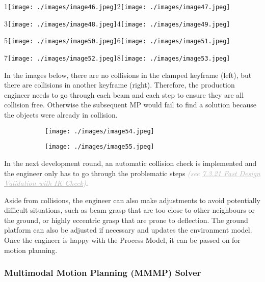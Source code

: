 {\footnotesize 1\texttt{[image: ./images/image46.jpeg]}2\texttt{[image: ./images/image47.jpeg]}}

{\footnotesize 3\texttt{[image: ./images/image48.jpeg]}4\texttt{[image: ./images/image49.jpeg]}}

{\footnotesize 5\texttt{[image: ./images/image50.jpeg]}6\texttt{[image: ./images/image51.jpeg]}}

{\footnotesize 7}\texttt{[image: ./images/image52.jpeg]}{\footnotesize 8}\texttt{[image: ./images/image53.jpeg]}

In the images below, there are no collisions in the clamped keyframe (left), but there are collisions in another keyframe (right). Therefore, the production engineer needs to go through each beam and each step to ensure they are all collision free. Otherwise the subsequent MP would fail to find a solution because the objects were already in collision. 

\begin{figure}[H]
\centering
\begin{subfigure}[b]{0.45\textwidth}
\centering
\texttt{[image: ./images/image54.jpeg]}
\end{subfigure}
\hfill
\begin{subfigure}[b]{0.45\textwidth}
\centering
\texttt{[image: ./images/image55.jpeg]}
\end{subfigure}
\end{figure}


In the next development round, an automatic collision check is implemented and the engineer only has to go through the problematic steps \textit{\textcolor[HTML]{B7B7B7}{(see \uline{7.3.21 Fast Design Validation with IK Check})}}.

Aside from collisions, the engineer can also make adjustments to avoid potentially difficult situations, such as beam grasp that are too close to other neighbours or the ground, or highly eccentric grasp that are prone to deflection. The ground platform can also be adjusted if necessary and updates the environment model. Once the engineer is happy with the Process Model, it can be passed on for motion planning. 

\subsubsection{Multimodal Motion Planning (MMMP) Solver}

